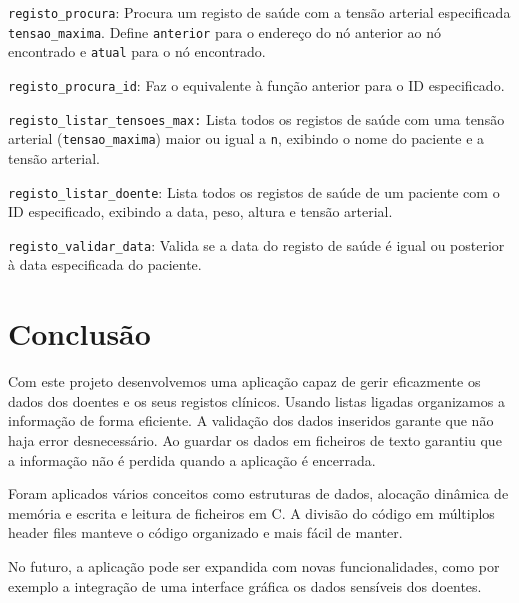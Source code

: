 \documentclass[a4paper, 12pt]{article}
\newcommand\code[1]{\texttt{\sloppy #1}}
\begin{document}
\code{registo\_procura}:
Procura um registo de saúde com a tensão arterial especificada \code{tensao\_maxima}. Define \code{anterior} para o endereço do nó anterior ao nó encontrado e \code{atual} para o nó encontrado.

\code{registo\_procura\_id}:
Faz o equivalente à função anterior para o ID especificado. 

\code{registo\_listar\_tensoes\_max:} 
Lista todos os registos de saúde com uma tensão arterial (\texttt{tensao\_maxima}) maior ou igual a \texttt{n}, exibindo o nome do paciente e a tensão arterial.

\code{registo\_listar\_doente}:
Lista todos os registos de saúde de um paciente com o ID especificado, exibindo a data, peso, altura e tensão arterial.

\code{registo\_validar\_data}: 
Valida se a data do registo de saúde é igual ou posterior à data especificada do paciente.


\section{Conclusão}
Com este projeto desenvolvemos uma aplicação capaz de gerir eficazmente os dados dos doentes e os seus registos clínicos. Usando listas ligadas organizamos a informação de forma eficiente. A validação dos dados inseridos garante que não haja error desnecessário. Ao guardar os dados em ficheiros de texto garantiu que a informação não é perdida quando a aplicação é encerrada.

Foram aplicados vários conceitos como estruturas de dados, alocação dinâmica de memória e escrita e leitura de ficheiros em C. A divisão do código em múltiplos header files manteve o código organizado e mais fácil de manter.

No futuro, a aplicação pode ser expandida com novas funcionalidades, como por exemplo a integração de uma interface gráfica os dados sensíveis dos doentes.
\end{document}
